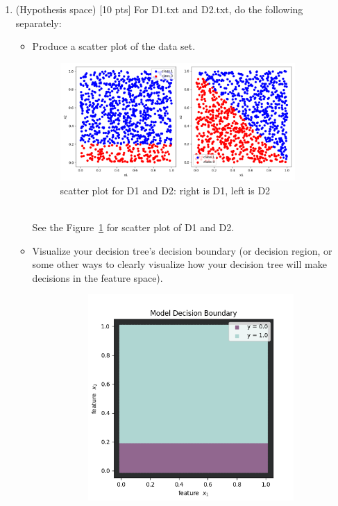 \documentclass[a4paper]{article}
\theoremstyle{definition}
\newenvironment{soln}{
    \leavevmode\color{blue}\ignorespaces
}{}
\begin{document}
\begin{enumerate}
\item (Hypothesis space)  [10 pts] For D1.txt and D2.txt, do the following separately:
  \begin{itemize}
  
  \item Produce a scatter plot of the data set.
    \begin{soln}
      \begin{figure}
        \centering
        \includegraphics[width=0.9\textwidth]{./data/p2q5.png}
        \caption{scatter plot for D1 and D2: right is D1, left is D2}
        \label{fig:scatterD1D2}
      \end{figure}
      \\See the Figure~\ref{fig:scatterD1D2} for scatter plot of D1 and D2.
    \end{soln}
  \item Visualize your decision tree's decision boundary (or decision region, or some other ways to clearly visualize how your decision tree will make decisions in the feature space).
  \begin{soln}
    \begin{figure}
      \begin{subfigure}{.6\textwidth}
        \includegraphics[width=0.9\linewidth]{./data/d1bound.png}

\end{subfigure}
\end{figure}
\end{soln}
\end{itemize}
\end{enumerate}
\end{document}
